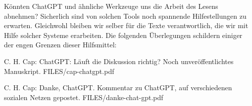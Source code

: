 Könnten ChatGPT und ähnliche Werkzeuge uns die Arbeit des Lesens abnehmen?
Sicherlich sind von solchen Tools noch spannende Hilfestellungen zu erwarten.
Gleichwohl bleiben wir selber für die Texte verantwortlich, die wir
mit Hilfe solcher Systeme erarbeiten. Die folgenden Überlegungen
schildern einiger der engen Grenzen dieser Hilfsmittel:

{C. H. Cap: ChatGPT: Läuft die Diskussion richtig? Noch unveröffentlichtes Manuskript.}
{FILES/cap-chatgpt.pdf}
{}


{C. H. Cap: Danke, ChatGPT. Kommentar zu ChatGPT, auf verschiedenen sozialen Netzen gepostet.}
{FILES/danke-chat-gpt.pdf}
{}


